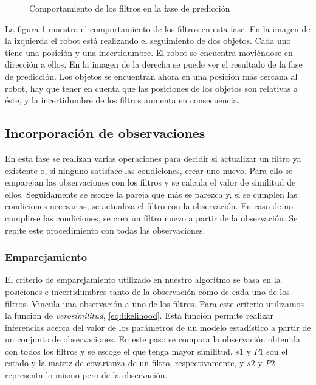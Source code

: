\begin{figure}[h]
  \centering
  \caption{Comportamiento de los filtros en la fase de predicción}
  \label{fig:prediccion}
\end{figure}

La figura \ref{fig:prediccion} muestra el comportamiento de los filtros en esta fase. En la imagen de la izquierda el robot está realizando el seguimiento de dos objetos. Cada uno tiene una posición y una incertidumbre. El robot se encuentra moviéndose en dirección a ellos. En la imagen de la derecha se puede ver el resultado de la fase de predicción. Los objetos se encuentran ahora en una posición más cercana al robot, hay que tener en cuenta que las posiciones de los objetos son relativas a éste, y la incertidumbre de los filtros aumenta en consecuencia. \\

\subsection{Incorporación de observaciones}
\label{subsec:incorporacionobservaciones}

En esta fase se realizan varias operaciones para decidir si actualizar un filtro ya existente o, si ninguno satisface las condiciones, crear uno nuevo. Para ello se emparejan las observaciones con los filtros y se calcula el valor de similitud de ellos. Seguidamente se escoge la pareja que más se parezca y, si se cumplen las condiciones necesarias, se actualiza el filtro con la observación. En caso de no cumplirse las condiciones, se crea un filtro nuevo a partir de la observación. Se repite este procedimiento con todas las observaciones. \\

\subsubsection{Emparejamiento}
\label{subsubsec:emparejamiento}

El criterio de emparejamiento utilizado en nuestro algoritmo se basa en la posiciones e incertidumbres tanto de la observación como de cada uno de los filtros. Vincula una observación a uno de los filtros. Para este criterio utilizamos la función de \textit{verosimilitud}, \ref{eq:likelihood}. Esta función permite realizar inferencias acerca del valor de los parámetros de un modelo estadístico a partir de un conjunto de observaciones. En este paso se compara la observación obtenida con todos los filtros y se escoge el que tenga mayor similitud. $s1$ y $P1$ son el estado y la matriz de covarianza de un filtro, respectivamente, y $s2$ y $P2$ representa lo mismo pero de la observación.

